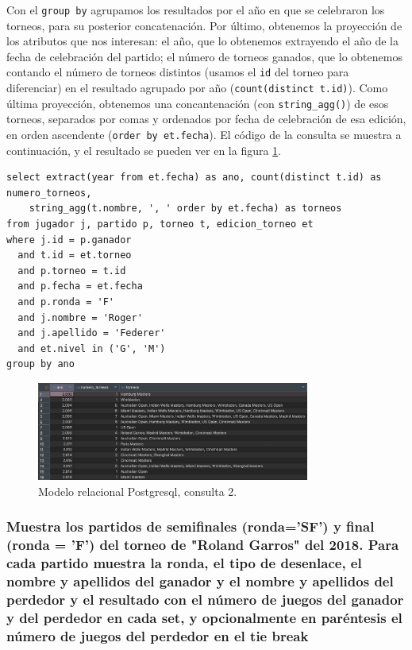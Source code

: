 Con el \texttt{group by} agrupamos los resultados por el año en que se celebraron los torneos, para su posterior concatenación. Por último, obtenemos la proyección de los atributos que nos interesan: el año, que lo obtenemos extrayendo el año de la fecha de celebración del partido; el número de torneos ganados, que lo obtenemos contando el número de torneos distintos (usamos el \texttt{id} del torneo para diferenciar) en el resultado agrupado por año (\texttt{count(distinct t.id)}). Como última proyección, obtenemos una concantenación (con \texttt{string\_agg()}) de esos torneos, separados por comas y ordenados por fecha de celebración de esa edición, en orden ascendente (\texttt{order by et.fecha}). El código de la consulta se muestra a continuación, y el resultado se pueden ver en la figura \ref{fig:q2_rel}.

\begin{verbatim}
select extract(year from et.fecha) as ano, count(distinct t.id) as numero_torneos, 
	string_agg(t.nombre, ', ' order by et.fecha) as torneos
from jugador j, partido p, torneo t, edicion_torneo et
where j.id = p.ganador
  and t.id = et.torneo
  and p.torneo = t.id
  and p.fecha = et.fecha
  and p.ronda = 'F'
  and j.nombre = 'Roger'
  and j.apellido = 'Federer'
  and et.nivel in ('G', 'M')
group by ano
\end{verbatim}

\begin{figure}[H]
\centering
\includegraphics[width=0.8\textwidth]{fotos/q2_rel.png}
\caption{Modelo relacional Postgresql, consulta 2.}
\label{fig:q2_rel}
\end{figure}


\subsubsection{Muestra los partidos de semiﬁnales (ronda='SF') y ﬁnal (ronda = 'F') del torneo de "Roland Garros" del 2018. Para cada partido muestra la ronda, el tipo de desenlace, el nombre y apellidos del ganador y el nombre y apellidos del perdedor y el resultado con el número de juegos del ganador y del perdedor en cada set, y opcionalmente en paréntesis el número de juegos del perdedor en el tie break}

